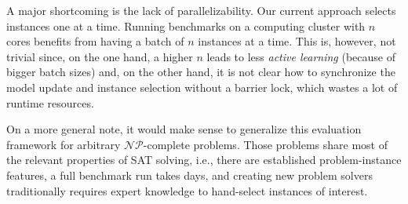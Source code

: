 \documentclass[runningheads]{llncs}
\begin{document}
A major shortcoming is the lack of parallelizability.
Our current approach selects instances one at a time.
Running benchmarks on a computing cluster with $n$ cores benefits from having a batch of $n$ instances at a time.
This is, however, not trivial since, on the one hand, a higher $n$ leads to less \emph{active learning} (because of bigger batch sizes) and, on the other hand, it is not clear how to synchronize the model update and instance selection without a barrier lock, which wastes a lot of runtime resources.

On a more general note, it would make sense to generalize this evaluation framework for arbitrary $\mathcal{NP}$-complete problems.
Those problems share most of the relevant properties of SAT solving, i.e., there are established problem-instance features, a full benchmark run takes days, and creating new problem solvers traditionally requires expert knowledge to hand-select instances of interest.


%
%


\end{document}

